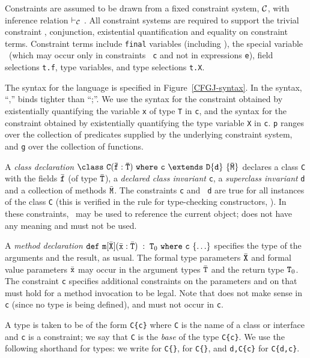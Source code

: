 Constraints are assumed to be drawn from a fixed constraint system,
$\cal C$, with inference relation $\vdash_{\cal C}$ \cite{CCCC}.
All
constraint systems are required to support the trivial constraint
\true, conjunction, existential quantification and equality on
constraint terms. Constraint terms include {\tt final} variables
(including \this), the
special variable \self\ (which may occur only in constraints {\tt
c} and not in expressions {\tt e}), field selections {\tt t.f},
type variables, and type selections {\tt t.X}.

The syntax for the language is specified in Figure~\ref{CFGJ-syntax}.
In the syntax, ``,'' binds tighter than ``;''. We use the syntax
for the constraint obtained by existentially quantifying the
variable {\tt x} of type {\tt T} in {\tt c},
and the syntax
for the constraint obtained by existentially quantifying the
type variable {\tt X} in {\tt c}.
{\tt p} ranges over
the collection of predicates supplied by the underlying constraint
system, and {\tt g} over the collection of functions.

A {\em class declaration}
$\tt\class \ C(\TY{\bar{T}}{\bar{f}})\ where\ c\ \extends\ D\{d\}\ \{\bar{M}\}$
declares a class {\tt C} with the
fields $\bar{\tt f}$ (of type $\bar{\tt T}$), a {\em declared class
invariant} {\tt c}, a {\em superclass invariant} {\tt d} and a
collection of methods $\bar{\tt M}$. The constraints {\tt c} and {\tt
d} are true for all instances of the class {\tt C} (this is verified
in the rule for type-checking constructors, ).  In these
constraints, \this\ may be used to reference the current object;
\self{} does not have any meaning and must not be used.

A {\em method declaration}
${\tt def~m}[\bar{\tt X}](\TY{\bar{\tt T}}{\bar{\tt x}})\;:\;{\tt T}_0~{\tt where~c}~\{\ldots\}$
specifies the type of the arguments and the result, as
usual.  The formal type parameters $\bar{\tt X}$ and formal
value parameters $\bar{\tt x}$ may occur in the argument
types $\bar{\tt T}$ and the return type ${\tt T}_0$.  The constraint
{\tt c} specifies additional constraints on the parameters and
on
\this{} that must hold for a method invocation to be legal. Note that
\self{} does not make sense in {\tt c} (since no type is being
defined), and must not occur in {\tt c}.

A type is taken to be of the form {\tt C\{c\}} where {\tt C} is the
name of a class or interface and {\tt c} is a constraint; we say that
{\tt C} is the {\em base} of the type {\tt C\{c\}}.
We use the following shorthand for types: 
we write
{\tt {}} for
{\tt C\{\}},
{\tt {}} for
{\tt C\{\}},
and {\tt d,C\{c\}} for {\tt C\{d,c\}}.

